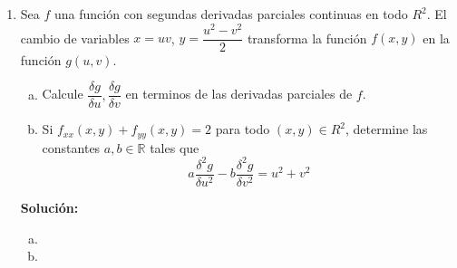 \documentclass[12pt]{article}
\newenvironment{solucion}
{\begin{mdframed}[backgroundcolor=black!10]
		{\bf Solución:}\\
	}
	{
	\end{mdframed}
}
\newenvironment{preguntas}
{\begin{enumerate}\itemsep12pt
	}
	{
	\end{enumerate}
}
\newcommand{\R}{\mathbb{R}}
\begin{document}
\begin{preguntas}
\begin{solucion}
\begin{enumerate}[a)]
\item $z = x^2+y^2+xy$\tab$x=sen(t), y=e^t$\\
			\\
			$z_t = z_x x_t + z_y y_z = (2x+y)cos(t) + (2y+x)e^t$
\item $w=xe^{y/z}$\tab$x=t^2, y=1-t, z=1+2t$\\
			\\
			{\small$w_t = w_x x_t + w_y y_t + w_z z_t = e^{y/z} 2t + xe^{y/z}\dfrac{1}{z}\cdot(-1) + xe^{y/z} \cdot \dfrac{-1}{z^2}\cdot 2 = e^{y/z}\left(2t - \dfrac{x}{z} - \dfrac{2x}{z^2}\right)$}
\item $w=ln(\sqrt[]{x^2+y^2+z^2})$\tab$x=sen(t), y=cos(t), z=tan(t)$\\
			\\
			$w_t = w_x x_t + w_y y_t + w_z z_t$
			$$ = \dfrac{1}{\sqrt[]{x^2+y^2+z^2}}\cdot \dfrac{1}{2\ \sqrt[]{x^2+y^2+z^2}} (2x\ cos(t) - 2y\ sen(t) + 2z\ sec^2(t))$$
			$$ = \dfrac{1}{x^2+y^2+z^2} (x\ cos(t) - y\ sen(t) + z\ sec^2(t)) \qquad \qquad \qquad \qquad \qquad$$
\end{enumerate}
\end{solucion}
\item Sea $f$ una función con segundas derivadas parciales continuas en todo $R^2$. El cambio de variables $x=uv$, $y=\dfrac{u^2-v^2}{2}$ transforma la función $f(x,y)$ en la función $g(u,v)$.
\begin{enumerate}[a)]
\item Calcule $\dfrac{\delta g}{\delta u}, \dfrac{\delta g}{\delta v}$ en terminos de las derivadas parciales de $f$.
\item Si $f_{xx}(x,y) + f_{yy}(x,y) = 2$ para todo $(x,y) \in R^2$, determine las constantes $a,b \in \R$ tales que
		$$a\dfrac{\delta^2g}{\delta u^2} - b\dfrac{\delta^2 g}{\delta v^2} = u^2 + v^2$$
\end{enumerate}
\begin{solucion}

\begin{enumerate}[a)]
\item 
\item 
\end{enumerate}
\end{solucion}
\end{preguntas}
\end{document}
